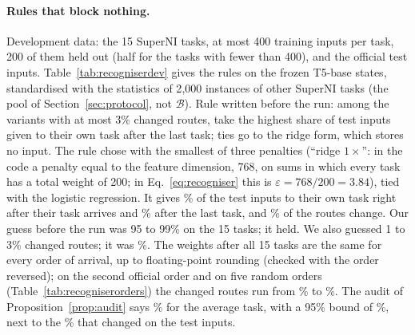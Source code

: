 \begin{table}[t]
  \caption{Features, development data (the benchmark tasks were used to choose among the variants). Top: the zone rule of Section~\ref{sec:noinstruction} with three frozen features on the 15 SuperNI tasks; means over the tasks, in \%: test inputs inside their own zone; blocked by an older zone when their task arrives; given to their own task after the last task; whose route changed after their task arrived. Middle: a joint recogniser over all tasks, fitted by logistic regression on stored fit features or by Eq.~\eqref{eq:recogniser} on random cosine features, on the sentence encoder with or without the shape numbers or character n-grams, for the 15 SuperNI and the 15 Long Sequence tasks; the last pair of columns is $(H{+}1)/(m{+}1)$, where $H$ of the $m$ held-out inputs of a task changed route (Proposition~\ref{prop:audit}), the line against which the change was read. Bottom: the audit of Proposition~\ref{prop:audit} for the variant that was chosen (logistic regression with shape numbers): the estimate $H/m$ and the 95\% bound, averaged over the tasks.}
  \label{tab:recogniserfeatures}
  \centering
  
\end{table}

\paragraph{Rules that block nothing.} Development data: the 15 SuperNI tasks, at most 400 training inputs per task, 200 of them held out (half for the tasks with fewer than 400), and the official test inputs.
Table~\ref{tab:recogniserdev} gives the rules on the frozen T5-base states, standardised with the statistics of 2{,}000 instances of other SuperNI tasks (the pool of Section~\ref{sec:protocol}, not $\mathcal{B}$).
Rule written before the run: among the variants with at most 3\% changed routes, take the highest share of test inputs given to their own task after the last task; ties go to the ridge form, which stores no input.
The rule chose \recog{} with the smallest of three penalties (``ridge $1\times$'': in the code a penalty equal to the feature dimension, 768, on sums in which every task has a total weight of 200; in Eq.~\eqref{eq:recogniser} this is $\varepsilon = 768/200 = 3.84$), tied with the logistic regression.
It gives \AudDevLLamOneArrive{}\% of the test inputs to their own task right after their task arrives and \AudDevLLamOneEnd{}\% after the last task, and \AudDevLLamOneChanged{}\% of the routes change.
Our guess before the run was 95 to 99\% on the 15 tasks; it held. We also guessed 1 to 3\% changed routes; it was \AudDevLLamOneChanged{}\%.
The weights after all 15 tasks are the same for every order of arrival, up to floating-point rounding (checked with the order reversed); on the second official order and on five random orders (Table~\ref{tab:recogniserorders}) the changed routes run from \AudOrdRandTwoLChanged{}\% to \AudOrdTwoLChanged{}\%.
The audit of Proposition~\ref{prop:audit} says \AudDevLLamOneAuditEst{}\% for the average task, with a 95\% bound of \AudDevLLamOneAuditBound{}\%, next to the \AudDevLLamOneChanged{}\% that changed on the test inputs.

